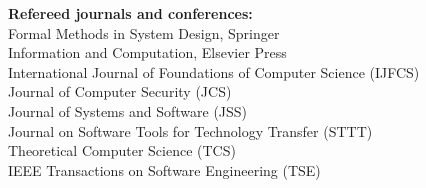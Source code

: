 \begin{resume}
{\bf Refereed journals and conferences:}\\
   Formal Methods in System Design, Springer\\
   Information and Computation, Elsevier Press\\
   International Journal of Foundations of Computer Science (IJFCS)\\
   Journal of Computer Security (JCS)\\
   Journal of Systems and Software (JSS)\\
   Journal on Software Tools for Technology Transfer (STTT)\\
   Theoretical Computer Science (TCS)\\
   IEEE Transactions on Software Engineering (TSE)
\vspace{-0.2cm}

   

\end{resume}
